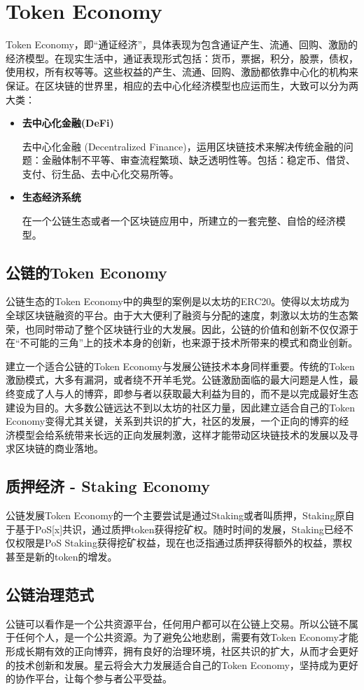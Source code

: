 \section{Token Economy}
Token Economy，即“通证经济”，具体表现为包含通证产生、流通、回购、激励的经济模型。在现实生活中，通证表现形式包括：货币，票据，积分，股票，债权，使用权，所有权等等。这些权益的产生、流通、回购、激励都依靠中心化的机构来保证。在区块链的世界里，相应的去中心化经济模型也应运而生，大致可以分为两大类：

\begin{itemize}

	\item \textbf{去中心化金融(DeFi)}

	去中心化金融 (Decentralized Finance)，运用区块链技术来解决传统金融的问题：金融体制不平等、审查流程繁琐、缺乏透明性等。包括：稳定币、借贷、支付、衍生品、去中心化交易所等。

	\item \textbf{生态经济系统}

	在一个公链生态或者一个区块链应用中，所建立的一套完整、自恰的经济模型。

\end{itemize}

\subsection{公链的Token Economy}

公链生态的Token Economy中的典型的案例是以太坊的ERC20。使得以太坊成为全球区块链融资的平台。由于大大便利了融资与分配的速度，刺激以太坊的生态繁荣，也同时带动了整个区块链行业的大发展。因此，公链的价值和创新不仅仅源于在“不可能的三角”上的技术本身的创新，也来源于技术所带来的模式和商业创新。

建立一个适合公链的Token Economy与发展公链技术本身同样重要。传统的Token激励模式，大多有漏洞，或者绕不开羊毛党。公链激励面临的最大问题是人性，最终变成了人与人的博弈，即参与者以获取最大利益为目的，而不是以完成最好生态建设为目的。大多数公链远达不到以太坊的社区力量，因此建立适合自己的Token Economy变得尤其关键，关系到共识的扩大，社区的发展，一个正向的博弈的经济模型会给系统带来长远的正向发展刺激，这样才能带动区块链技术的发展以及寻求区块链的商业落地。

\subsection{质押经济 - Staking Economy}
公链发展Token Economy的一个主要尝试是通过Staking或者叫质押，Staking原自于基于PoS[x]共识，通过质押token获得挖矿权。随时时间的发展，Staking已经不仅权限是PoS Staking获得挖矿权益，现在也泛指通过质押获得额外的权益，票权甚至是新的token的增发。

\subsection{公链治理范式}
公链可以看作是一个公共资源平台，任何用户都可以在公链上交易。所以公链不属于任何个人，是一个公共资源。为了避免公地悲剧，需要有效Token Economy才能形成长期有效的正向博弈，拥有良好的治理环境，社区共识的扩大，从而才会更好的技术创新和发展。星云将会大力发展适合自己的Token Economy，坚持成为更好的协作平台，让每个参与者公平受益。